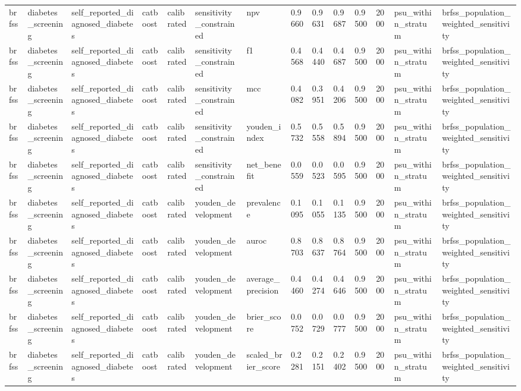 \begin{tabular}{llllllllllllll}
brfss & diabetes\_screening & self\_reported\_diagnosed\_diabetes & catboost & calibrated & sensitivity\_constrained & npv & 0.9660 & 0.9631 & 0.9687 & 0.9500 & 2000 & psu\_within\_stratum & brfss\_population\_weighted\_sensitivity \\
brfss & diabetes\_screening & self\_reported\_diagnosed\_diabetes & catboost & calibrated & sensitivity\_constrained & f1 & 0.4568 & 0.4440 & 0.4687 & 0.9500 & 2000 & psu\_within\_stratum & brfss\_population\_weighted\_sensitivity \\
brfss & diabetes\_screening & self\_reported\_diagnosed\_diabetes & catboost & calibrated & sensitivity\_constrained & mcc & 0.4082 & 0.3951 & 0.4206 & 0.9500 & 2000 & psu\_within\_stratum & brfss\_population\_weighted\_sensitivity \\
brfss & diabetes\_screening & self\_reported\_diagnosed\_diabetes & catboost & calibrated & sensitivity\_constrained & youden\_index & 0.5732 & 0.5558 & 0.5894 & 0.9500 & 2000 & psu\_within\_stratum & brfss\_population\_weighted\_sensitivity \\
brfss & diabetes\_screening & self\_reported\_diagnosed\_diabetes & catboost & calibrated & sensitivity\_constrained & net\_benefit & 0.0559 & 0.0523 & 0.0595 & 0.9500 & 2000 & psu\_within\_stratum & brfss\_population\_weighted\_sensitivity \\
brfss & diabetes\_screening & self\_reported\_diagnosed\_diabetes & catboost & calibrated & youden\_development & prevalence & 0.1095 & 0.1055 & 0.1135 & 0.9500 & 2000 & psu\_within\_stratum & brfss\_population\_weighted\_sensitivity \\
brfss & diabetes\_screening & self\_reported\_diagnosed\_diabetes & catboost & calibrated & youden\_development & auroc & 0.8703 & 0.8637 & 0.8764 & 0.9500 & 2000 & psu\_within\_stratum & brfss\_population\_weighted\_sensitivity \\
brfss & diabetes\_screening & self\_reported\_diagnosed\_diabetes & catboost & calibrated & youden\_development & average\_precision & 0.4460 & 0.4274 & 0.4646 & 0.9500 & 2000 & psu\_within\_stratum & brfss\_population\_weighted\_sensitivity \\
brfss & diabetes\_screening & self\_reported\_diagnosed\_diabetes & catboost & calibrated & youden\_development & brier\_score & 0.0752 & 0.0729 & 0.0777 & 0.9500 & 2000 & psu\_within\_stratum & brfss\_population\_weighted\_sensitivity \\
brfss & diabetes\_screening & self\_reported\_diagnosed\_diabetes & catboost & calibrated & youden\_development & scaled\_brier\_score & 0.2281 & 0.2151 & 0.2402 & 0.9500 & 2000 & psu\_within\_stratum & brfss\_population\_weighted\_sensitivity \\

\end{tabular}
